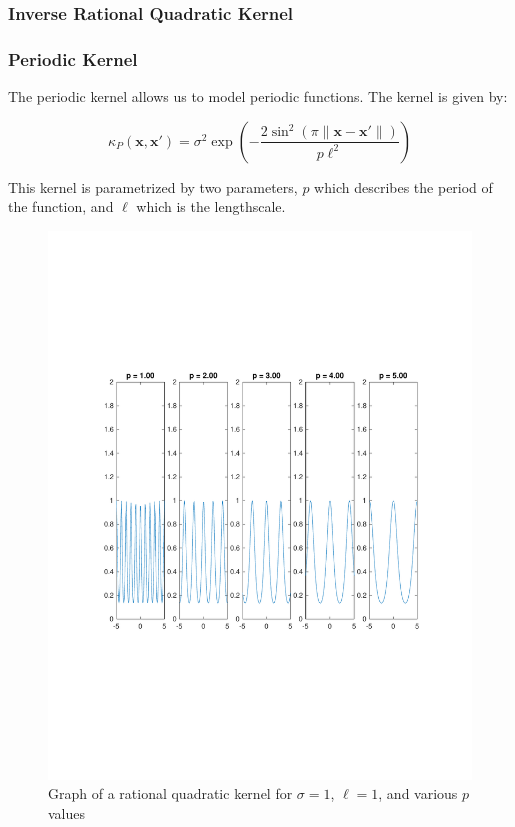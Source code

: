 \documentclass{article}
\newcommand{\bx}{\boldsymbol{x}}
\begin{document}
\subsubsection{Inverse Rational Quadratic Kernel}

\subsubsection{Periodic Kernel}

The periodic kernel allows us to model periodic functions. The kernel is given by:

\[
  \kappa_{P}(\bx, \bx') = \sigma^{2}  \exp(- \frac{2 \sin^{2}(\pi \|\bx - \bx'\|)}{p \ell^{2}})
\]

This kernel is parametrized by two parameters, $p$ which describes the period of the function, and $\ell$ which is the
lengthscale\cite{duvenaud_automatic_2014}.

\begin{figure}[H] \label{fig:periodic_kernel}
  \caption{Graph of a rational quadratic kernel for $\sigma = 1$, $\ell = 1$, and various $p$ values}
  \includegraphics[width=\textwidth]{periodic_kernel}
\end{figure}
\end{document}
